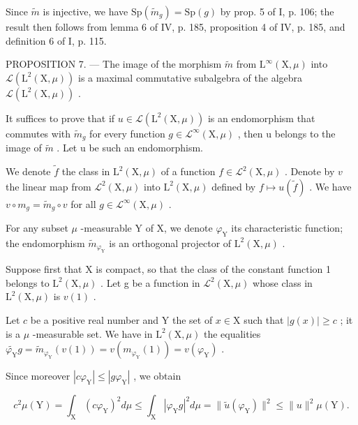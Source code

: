 Since \(\widetilde{m}\) is injective, we have \(\mathrm{Sp}(\widetilde{m}_{g}) = \mathrm{Sp}(g)\) by prop. 5 of I, p. 106; the result then follows from lemma 6 of IV, p. 185, proposition 4 of IV, p. 185, and definition 6 of I, p. 115.

PROPOSITION 7. --- The image of the morphism \(\tilde{m}\) from \(\mathrm{L}^{\infty}(\mathrm{X},\mu)\) into \(\mathcal{L}(\mathrm{L}^{2}(\mathrm{X},\mu))\) is a maximal commutative subalgebra of the algebra \(\mathcal{L}(\mathrm{L}^{2}(\mathrm{X},\mu))\) .

It suffices to prove that if \(u \in \mathcal{L}(\mathrm{L}^{2}(\mathrm{X}, \mu))\) is an endomorphism that commutes with \(\widetilde{m}_{g}\) for every function \(g \in \mathcal{L}^{\infty}(\mathrm{X}, \mu)\) , then u belongs to the image of \(\widetilde{m}\) . Let u be such an endomorphism.

We denote \(\tilde{f}\) the class in \(\mathrm{L}^2 (\mathrm{X},\mu)\) of a function \(f\in \mathcal{L}^2 (\mathrm{X},\mu)\) . Denote by \(v\) the linear map from \(\mathcal{L}^2 (\mathrm{X},\mu)\) into \(\mathrm{L}^2 (\mathrm{X},\mu)\) defined by \(f\mapsto u(\widetilde{f})\) . We have \(v\circ m_g = \widetilde{m}_g\circ v\) for all \(g\in \mathcal{L}^{\infty}(\mathrm{X},\mu)\) .

For any subset \(\mu\) -measurable Y of X, we denote \(\varphi_{\mathrm{Y}}\) its characteristic function; the endomorphism \(\widetilde{m}_{\varphi_{\mathrm{Y}}}\) is an orthogonal projector of \(\mathrm{L}^2 (\mathrm{X},\mu)\) .

Suppose first that X is compact, so that the class of the constant function 1 belongs to \(\mathrm{L}^{2}(\mathrm{X},\mu)\) . Let g be a function in \(\mathcal{L}^{2}(\mathrm{X},\mu)\) whose class in \(\mathrm{L}^{2}(\mathrm{X},\mu)\) is \(v(1)\) .

Let \(c\) be a positive real number and Y the set of \(x \in \mathrm{X}\) such that \(|g(x)| \geqslant c\) ; it is a \(\mu\) -measurable set. We have in \(\mathrm{L}^2(\mathrm{X}, \mu)\) the equalities \(\widetilde{\varphi_{\mathrm{Y}}} g = \widetilde{m}_{\varphi_{\mathrm{Y}}}(v(1)) = v(m_{\varphi_{\mathrm{Y}}}(1)) = v(\varphi_{\mathrm{Y}})\) .

Since moreover \(|c\varphi_{\mathrm{Y}}| \leqslant |g\varphi_{\mathrm{Y}}|\) , we obtain

\[
c ^ {2} \mu (\mathrm{Y}) = \int_ {\mathrm{X}} (c \varphi_ {\mathrm{Y}}) ^ {2} d \mu \leqslant \int_ {\mathrm{X}} | \varphi_ {\mathrm{Y}} g | ^ {2} d \mu = \| \widetilde {u} (\varphi_ {\mathrm{Y}}) \| ^ {2} \leqslant \| u \| ^ {2} \mu (\mathrm{Y}).
\]

